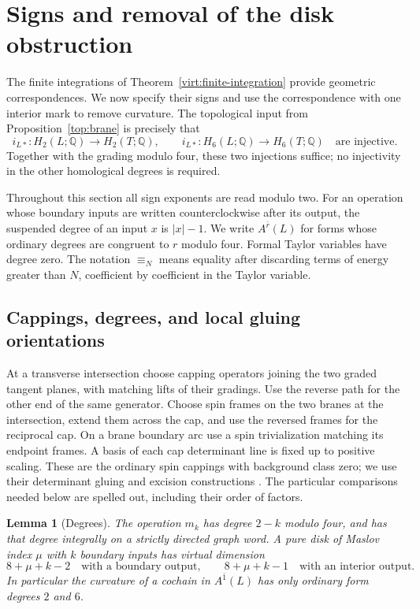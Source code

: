 \documentclass[11pt]{article}
\newtheorem{lemma}[theorem]{Lemma}
\theoremstyle{definition}
\theoremstyle{remark}
\newcommand{\Q}{\mathbb Q}
\numberwithin{equation}{section}
\begin{document}
\section{Signs and removal of the disk obstruction}
\label{obs:section}

The finite integrations of Theorem~\ref{virt:finite-integration} provide
geometric correspondences.  We now specify their signs and use the
correspondence with one interior mark to remove curvature.  The topological
input from Proposition~\ref{top:brane} is precisely that
\begin{equation}
 \label{obs:topological-input}
 i_{L*}:H_2(L;\Q)\longrightarrow H_2(T;\Q),\qquad
 i_{L*}:H_6(L;\Q)\longrightarrow H_6(T;\Q)
 \quad\text{are injective}.
\end{equation}
Together with the grading modulo four, these two injections suffice; no
injectivity in the other homological degrees is required.

Throughout this section all sign exponents are read modulo two.  For an
operation whose boundary inputs are written counterclockwise after its
output, the suspended degree of an input $x$ is $|x|-1$.  We write
$A^{\bar r}(L)$ for forms whose ordinary degrees are congruent to $r$
modulo four.  Formal Taylor variables have degree zero.  The notation
$\equiv_N$ means equality after discarding terms of energy greater than
$N$, coefficient by coefficient in the Taylor variable.

\subsection{Cappings, degrees, and local gluing orientations}

At a transverse intersection choose capping operators joining the two
graded tangent planes, with matching lifts of their gradings.  Use the
reverse path for the other end of the same generator.  Choose spin frames
on the two branes at the intersection, extend them across the cap, and
use the reversed frames for the reciprocal cap.  On a brane boundary arc
use a spin trivialization matching its endpoint frames.  A basis of each
cap determinant line is fixed up to positive scaling.  These are the
ordinary spin cappings with background class zero; we use their
determinant gluing and excision constructions
\cite[Section~5]{akaho-joyce}.  The particular comparisons needed below are
spelled out, including their order of factors.

\begin{lemma}[Degrees]\label{obs:degree}
The operation $m_k$ has degree $2-k$ modulo four, and has that degree
integrally on a strictly directed graph word.  A pure disk of Maslov
index $\mu$ with $k$ boundary inputs has virtual dimension
\[
 8+\mu+k-2
 \quad\text{with a boundary output},\qquad
 8+\mu+k-1
 \quad\text{with an interior output}.
\]
In particular the curvature of a cochain in $A^{\bar1}(L)$ has only
ordinary form degrees $2$ and $6$.
\end{lemma}
\end{document}
